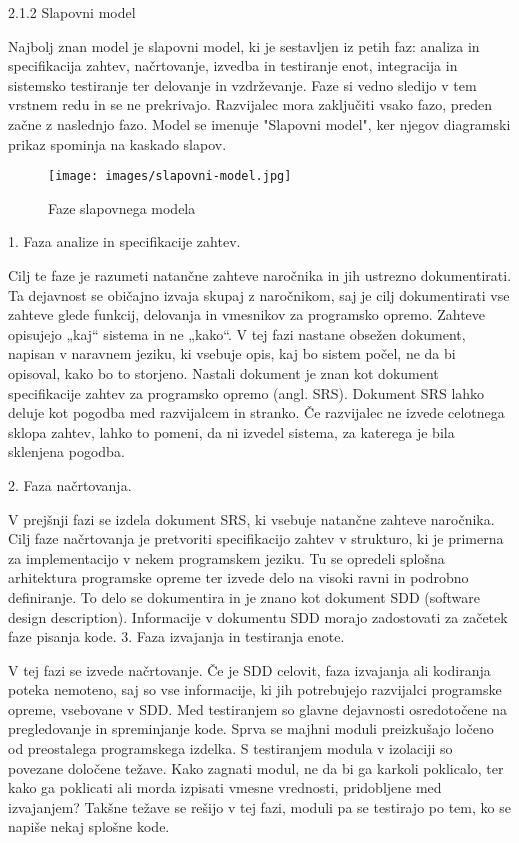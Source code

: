 \documentclass[a4paper,12pt,openright]{book}
\begin{document}
2.1.2 Slapovni model

Najbolj znan model je slapovni model, ki je sestavljen iz petih faz: analiza in specifikacija zahtev, načrtovanje, izvedba in testiranje enot, integracija in sistemsko testiranje ter delovanje in vzdrževanje. 
Faze si vedno sledijo v tem vrstnem redu in se ne prekrivajo. Razvijalec mora zaključiti vsako fazo, preden začne z naslednjo fazo. Model se imenuje "Slapovni model", ker njegov diagramski prikaz spominja na kaskado slapov.

\begin{figure}[H]
    \centering
    \texttt{[image: images/slapovni-model.jpg]}
    \caption{Faze slapovnega modela}
    \label{fig:enter-label}
\end{figure}

1. Faza analize in specifikacije zahtev.

Cilj te faze je razumeti natančne zahteve naročnika in jih ustrezno dokumentirati. Ta dejavnost se običajno izvaja skupaj z naročnikom, saj je cilj dokumentirati vse zahteve glede funkcij, delovanja in vmesnikov za programsko opremo. Zahteve opisujejo „kaj“ sistema in ne „kako“. V tej fazi nastane obsežen dokument, napisan v naravnem jeziku, ki vsebuje opis, kaj bo sistem počel, ne da bi opisoval, kako bo to storjeno. Nastali dokument je znan kot dokument specifikacije zahtev za programsko opremo (angl. SRS). Dokument SRS lahko deluje kot pogodba med razvijalcem in stranko. Če razvijalec ne izvede celotnega sklopa zahtev, lahko to pomeni, da ni izvedel sistema, za katerega je bila sklenjena pogodba.


2. Faza načrtovanja.

 V prejšnji fazi se izdela dokument SRS, ki vsebuje natančne zahteve naročnika. Cilj faze načrtovanja je pretvoriti specifikacijo zahtev v strukturo, ki je primerna za implementacijo v nekem programskem jeziku. Tu se opredeli splošna arhitektura programske opreme ter izvede delo na visoki ravni in podrobno deﬁniranje. To delo se dokumentira in je znano kot dokument SDD (software design description). Informacije v dokumentu SDD morajo zadostovati za začetek faze pisanja kode.
3. Faza izvajanja in testiranja enote.

V tej fazi se izvede načrtovanje. Če je SDD celovit, faza izvajanja ali kodiranja poteka nemoteno, saj so vse informacije, ki jih potrebujejo razvijalci programske opreme, vsebovane v SDD.
Med testiranjem so glavne dejavnosti osredotočene na pregledovanje in spreminjanje kode. Sprva se majhni moduli preizkušajo ločeno od preostalega programskega izdelka. S testiranjem modula v izolaciji so povezane določene težave. Kako zagnati modul, ne da bi ga karkoli poklicalo, ter kako ga poklicati ali morda izpisati vmesne vrednosti, pridobljene med izvajanjem? Takšne težave se rešijo v tej fazi, moduli pa se testirajo po tem, ko se napiše nekaj splošne kode.
\end{document}
